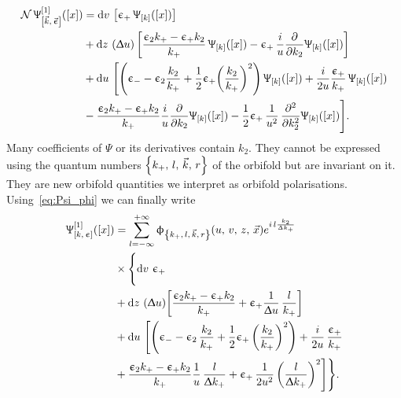 \begin{equation}
  \begin{split}
    \cN\,
    \Psi^{[1]}_{\qty[\vec{k},\, \vec{\epsilon}]}\qty(\qty[x])
    & =
    \dd{v}\,
    \qty[%
      \epsilon_+\, \Psi_{\qty[k]}\qty(\qty[x])
    ]
    \\
    & +
    \dd{z}\,
    \qty(\Delta u)\,
    \qty[%
      \frac{\epsilon_2 k_+ - \epsilon_+ k_2}{k_+}\,
      \Psi_{\qty[k]}\qty(\qty[x])
      - 
      \epsilon_+\, \frac{i}{u} \pdv{}{k_2} \Psi_{\qty[k]}\qty(\qty[x])
    ]
    \\
    & +
    \dd{u}\,
    \Biggl[
      \qty(%
        \epsilon_-
        -
        \epsilon_2 \frac{k_2}{k_+}
        +
        \frac{1}{2} \epsilon_+ \qty( \frac{k_2}{k_+} )^2
      )\,
      \Psi_{\qty[k]}\qty(\qty[x])
      + 
      \frac{i}{2 u} \frac{\epsilon_+}{k_+}\,
      \Psi_{\qty[k]}\qty(\qty[x])
      \\
      & -
      \frac{\epsilon_2 k_+ - \epsilon_+ k_2}{k_+}
      \frac{i}{u} \pdv{}{k_2} \Psi_{\qty[k]}\qty(\qty[x])
      -
      \frac{1}{2} \epsilon_+\,
      \frac{1}{u^2}\,
      \pdv[2]{}{k_2}
      \Psi_{\qty[k]}\qty(\qty[x])
    \Biggr].
  \end{split}
  \label{eq:a_uvz_from_covering}
\end{equation}
Many coefficients of $\Psi$ or its derivatives contain $k_2$. 
They cannot be expressed using the quantum numbers $\qty{k_+,\, l,\, \vec{k},\, r}$ of the orbifold but are invariant on it.
They are new orbifold quantities we interpret as orbifold polarisations.
Using~\eqref{eq:Psi_phi} we can finally write
\begin{equation}
  \begin{split}
    \Psi^{[1]}_{[k,\, \epsilon]}\qty(\qty[x])
    & =
    \infinfsum{l}
    \phi_{\kmkr}\qty(u,\, v,\, z,\, \vec{x})    
    e^{i\, l \frac{k_2}{\Delta k_+}}
    \\
    & \times
    \Biggl\lbrace
      \dd{v}\, \epsilon_+
      \\
      & +
      \dd{z}\, \qty(\Delta u)
      \qty[ %
        \frac{\epsilon_2 k_+ - \epsilon_+ k_2}{k_+}
         +
        \epsilon_+ \frac{1}{\Delta u}\, \frac{l}{k_+}
      ]
      \\
      & +
      \dd{u}\,
      \Biggl[
        \qty(%
          \epsilon_-
          -
          \epsilon_2\, \frac{k_2}{k_+}
          +
          \frac{1}{2} \epsilon_+\, \qty( \frac{k_2}{k_+} )^2
        )
        + 
        \frac{i}{2 u}\, \frac{\epsilon_+}{k_+}
        \\
        & +
        \frac{\epsilon_2 k_+ -\epsilon_+ k_2}{k_+}
        \frac{1}{u}\, \frac{l}{\Delta  k_+}
        +
        \epsilon_+\, \frac{1}{2 u^2}\, \qty(\frac{l}{ \Delta k_+})^2
      \Biggr]
    \Biggr\rbrace.
  \end{split}
  \label{eq:spin1_from_covering}
\end{equation}

